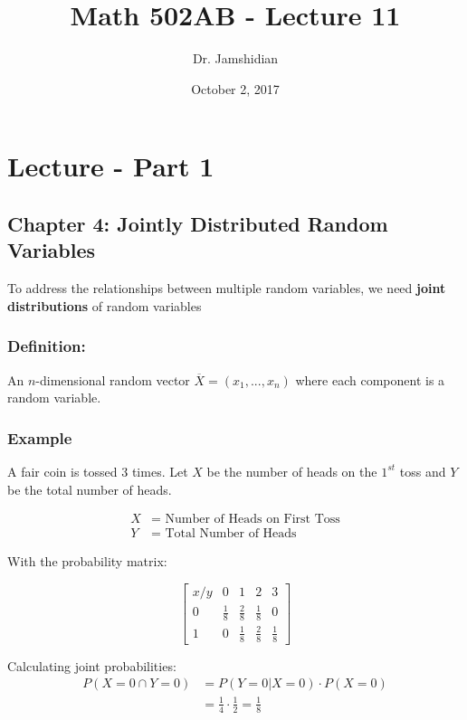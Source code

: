 \documentclass{article}
\title{Math 502AB - Lecture 11}
\author{Dr. Jamshidian}
\date{October 2, 2017}
\begin{document}
\maketitle

\section{Lecture - Part 1}

\subsection{Chapter 4: Jointly Distributed Random Variables}

To address the relationships between multiple random variables, we need \textbf{joint distributions} of random variables

\subsubsection*{Definition:}
    An $n$-dimensional random vector $\overline{X} = (x_1,...,x_n)$ where each component is a random variable.

\subsubsection*{Example}

A fair coin is tossed 3 times. Let $X$ be the number of heads on the $1^{st}$ toss and $Y$ be the total number of heads.

\begin{equation*}
    \begin{split}
        X &= \text{ Number of Heads on First Toss}\\
        Y &= \text{ Total Number of Heads}
    \end{split}
\end{equation*}

With the probability matrix:

\begin{equation*}
    \begin{bmatrix}
        x/y & 0 & 1 & 2 & 3\\
        0 & \frac{1}{8} & \frac{2}{8} & \frac{1}{8} & 0\\
        1 & 0 & \frac{1}{8} & \frac{2}{8} & \frac{1}{8}
    \end{bmatrix}
\end{equation*}

Calculating joint probabilities:
\begin{equation*}
\begin{split}
    P(X = 0 \cap Y = 0) &= P(Y=0 | X=0) \cdot P(X=0)\\
        &= \frac{1}{4} \cdot \frac{1}{2} = \frac{1}{8}
\end{split}
\end{equation*}
\end{document}
